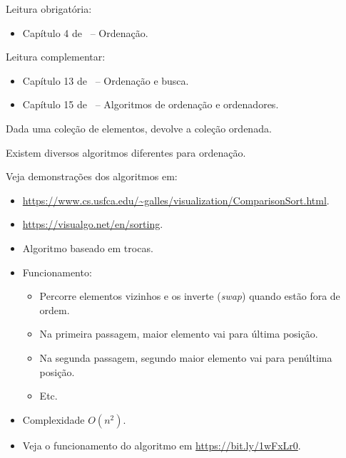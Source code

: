 \newcommand{\templatesdir}{../../../templates}
\newcommand{\template}{template-roteiro-est}


\newcommand{\content}{Ordenação de estruturas lineares}
\newcommand{\class}{Algoritmos e Estruturas de Dados}
\newcommand{\shortcourse}{45EST}



\makeheader

{
Leitura obrigatória:
\begin{itemize}
	\item Capítulo 4 de~\cite{Ziviani2010} -- Ordenação.
\end{itemize}

Leitura complementar:
\begin{itemize}
	\item Capítulo 13 de~\cite{Pereira2008} -- Ordenação e busca.
	\item Capítulo 15 de~\cite{Preiss2001} -- Algoritmos de ordenação e ordenadores.
\end{itemize}
}

\medskip


\begin{itemize}
	\item Dada uma coleção de elementos, devolve a coleção ordenada.
	
	{\color{redtext}
	\item Existem diversos algoritmos diferentes para ordenação.
	\item Veja demonstrações dos algoritmos em:
	{\fontsize{9pt}{4pt}
	\begin{itemize}
		\item \url{https://www.cs.usfca.edu/~galles/visualization/ComparisonSort.html}.
		\item \url{https://visualgo.net/en/sorting}.
	\end{itemize}
	}}
\end{itemize}

\medskip


\begin{itemize}
	\item Algoritmo baseado em trocas.
	\item Funcionamento:
	\begin{itemize}
		\item Percorre elementos vizinhos e os inverte (\textit{swap}) quando estão fora de ordem.
		\item Na primeira passagem, maior elemento vai para última posição.
		\item Na segunda passagem, segundo maior elemento vai para penúltima posição.
		\item Etc.
	\end{itemize}
	\item Complexidade $O(n^2)$.
	\item Veja o funcionamento do algoritmo em \url{https://bit.ly/1wFxLr0}.
\end{itemize}

